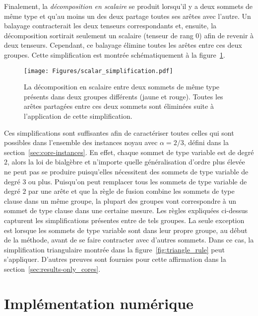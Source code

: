 Finalement, la \emph{décomposition en scalaire} se produit lorsqu'il y a deux sommets de même type et qu'au moins un des deux partage toutes ses arêtes avec l'autre.
Un balayage contracterait les deux tenseurs correspondants et, ensuite, la décomposition sortirait seulement un scalaire (tenseur de rang $0$) afin de revenir à deux tenseurs.
Cependant, ce balayage élimine toutes les arêtes entre ces deux groupes.
Cette simplification est montrée schématiquement à la figure~\ref{fig:scalar-decomposition}.
\begin{figure}[h]
    \centering
    \texttt{[image: Figures/scalar\_simplification.pdf]}
    \caption[Représentation graphique de la décomposition en scalaire entre deux sommets de même type présents dans deux groupes différents.]{La décomposition en scalaire entre deux sommets de même type présents dans deux groupes différents (jaune et rouge). Toutes les arêtes partagées entre ces deux sommets sont éliminées suite à l'application de cette simplification.}
    \label{fig:scalar-decomposition}
\end{figure}

Ces simplifications sont suffisantes afin de caractériser toutes celles qui sont possibles dans l'ensemble des instances noyau avec $\alpha = 2/3$, défini dans la section~\ref{sec:core-instances}.
En effet, chaque sommet de type variable est de degré $2$, alors la loi de bialgèbre et n'importe quelle généralisation d'ordre plus élevée ne peut pas se produire puisqu'elles nécessitent des sommets de type variable de degré $3$ ou plus.
Puisqu'on peut remplacer tous les sommets de type variable de degré $2$ par une arête et que la règle de fusion combine les sommets de type clause dans un même groupe, la plupart des groupes vont correspondre à un sommet de type clause dans une certaine mesure.
Les règles expliquées ci-dessus capturent les simplifications présentes entre de tels groupes.
La seule exception est lorsque les sommets de type variable sont dans leur propre groupe, au début de la méthode, avant de se faire contracter avec d'autres sommets.
Dans ce cas, la simplification triangulaire montrée dans la figure~\ref{fig:triangle_rule} peut s'appliquer.
D'autres preuves sont fournies pour cette affirmation dans la section~\ref{sec:results-only_cores}.



\chapter{Implémentation numérique}\label{ch:numerical-implementation}

